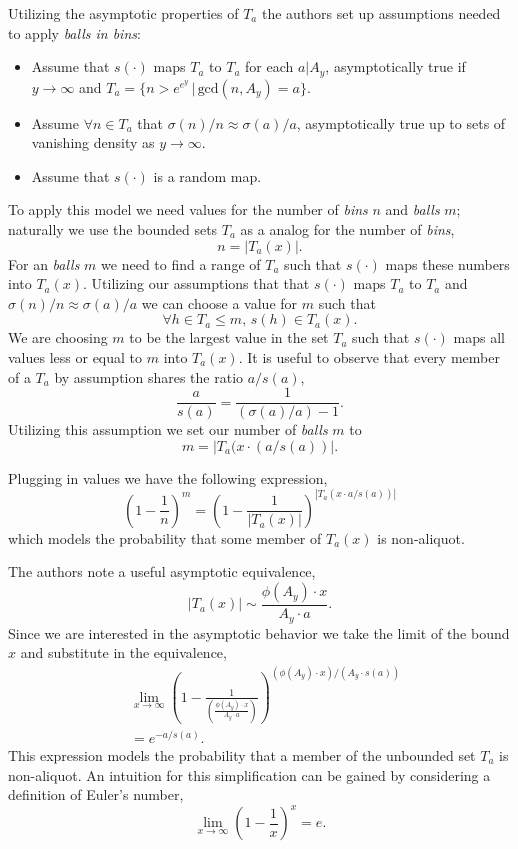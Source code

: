 \documentclass{article}
\theoremstyle{definition}
\begin{document}
Utilizing the asymptotic properties of $T_a$ the authors set up assumptions needed to apply \textit{balls in bins}:
\begin{itemize}
    \item Assume that $s(\cdot)$ maps $T_a$ to $T_a$ for each $a | A_y$, asymptotically true if $y \to \infty$ and $T_a = \{n > e^{e^y} \,|\, \text{gcd}(n, A_y) = a\}$.
    \item Assume $\forall n \in T_a $ that $\sigma(n)/n \approx \sigma(a)/a $, asymptotically true up to sets of vanishing density as $y \to \infty$.
    \item Assume that $s(\cdot)$ is a random map.
\end{itemize}

To apply this model we need values for the number of \textit{bins} $n$ and \textit{balls} $m$; naturally we use the bounded sets $T_a$ as a analog for the number of \textit{bins},
$$n = |T_a(x)|.$$
For an \textit{balls} $m$ we need to find a range of $T_a$ such that $s(\cdot)$ maps these numbers into $T_a(x)$. Utilizing our assumptions that that $s(\cdot)$ maps $T_a$ to $T_a$ and $\sigma(n)/n \approx \sigma(a)/a$ we can choose a value for $m$ such that
$$\forall h \in T_a \leq m,\, s(h) \in T_a(x).$$
We are choosing $m$ to be the largest value in the set $T_a$ such that $s(\cdot)$ maps all values less or equal to $m$ into $T_a(x)$. It is useful to observe that every member of a $T_a$ by assumption shares the ratio $a / s(a)$,
$$\frac{a}{s(a)} = \frac{1}{(\sigma(a)/a)-1}.$$
Utilizing this assumption we set our number of \textit{balls} $m$ to
$$m = |T_a(x \cdot (a/s(a))|.$$

Plugging in values we have the following expression,
$$\left(1-\frac{1}{n}\right)^m = \left(1-\frac{1}{|T_a(x)|}\right)^{|T_a(x\cdot a/s(a))|} $$
which models the probability that some member of $T_a(x)$ is non-aliquot.

The authors note a useful asymptotic equivalence,
$$|T_a(x)|  \sim  \frac{\phi(A_y) \cdot x}{ A_y \cdot a}.$$
Since we are interested in the asymptotic behavior we take the limit of the bound $x$ and substitute in the equivalence,
\begin{align*}
     & \lim_{x \to \infty}\left(1-\frac{1}{\left(\frac{\phi(A_y) \cdot x}{ A_y \cdot a}\right)}\right)^{(\phi(A_y) \cdot x)/( A_y \cdot s(a))} \\
     & = e^{-a/s(a)}.
\end{align*}
This expression models the probability that a member of the unbounded set $T_a$ is non-aliquot. An intuition for this simplification can be gained by considering a definition of Euler's number,
$$\lim_{x \to \infty} (1- \frac{1}{x})^x = e.$$
\end{document}
